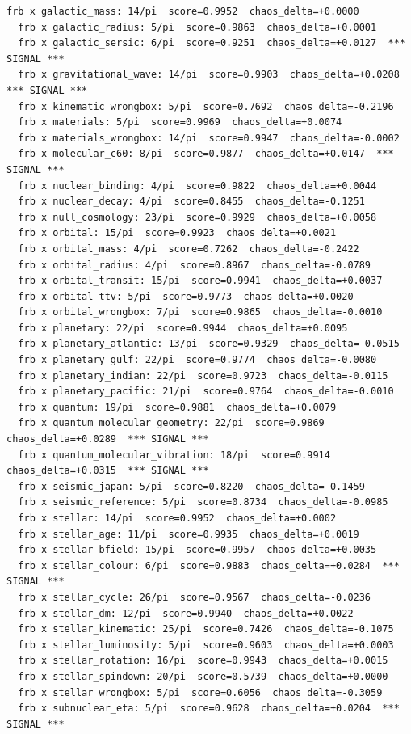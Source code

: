 \documentclass[11pt, letterpaper, openany]{book}
\begin{document}
\begin{empiricalbox}
\begin{lstlisting}[style=terminal]
  frb x galactic_mass: 14/pi  score=0.9952  chaos_delta=+0.0000
  frb x galactic_radius: 5/pi  score=0.9863  chaos_delta=+0.0001
  frb x galactic_sersic: 6/pi  score=0.9251  chaos_delta=+0.0127  *** SIGNAL ***
  frb x gravitational_wave: 14/pi  score=0.9903  chaos_delta=+0.0208  *** SIGNAL ***
  frb x kinematic_wrongbox: 5/pi  score=0.7692  chaos_delta=-0.2196
  frb x materials: 5/pi  score=0.9969  chaos_delta=+0.0074
  frb x materials_wrongbox: 14/pi  score=0.9947  chaos_delta=-0.0002
  frb x molecular_c60: 8/pi  score=0.9877  chaos_delta=+0.0147  *** SIGNAL ***
  frb x nuclear_binding: 4/pi  score=0.9822  chaos_delta=+0.0044
  frb x nuclear_decay: 4/pi  score=0.8455  chaos_delta=-0.1251
  frb x null_cosmology: 23/pi  score=0.9929  chaos_delta=+0.0058
  frb x orbital: 15/pi  score=0.9923  chaos_delta=+0.0021
  frb x orbital_mass: 4/pi  score=0.7262  chaos_delta=-0.2422
  frb x orbital_radius: 4/pi  score=0.8967  chaos_delta=-0.0789
  frb x orbital_transit: 15/pi  score=0.9941  chaos_delta=+0.0037
  frb x orbital_ttv: 5/pi  score=0.9773  chaos_delta=+0.0020
  frb x orbital_wrongbox: 7/pi  score=0.9865  chaos_delta=-0.0010
  frb x planetary: 22/pi  score=0.9944  chaos_delta=+0.0095
  frb x planetary_atlantic: 13/pi  score=0.9329  chaos_delta=-0.0515
  frb x planetary_gulf: 22/pi  score=0.9774  chaos_delta=-0.0080
  frb x planetary_indian: 22/pi  score=0.9723  chaos_delta=-0.0115
  frb x planetary_pacific: 21/pi  score=0.9764  chaos_delta=-0.0010
  frb x quantum: 19/pi  score=0.9881  chaos_delta=+0.0079
  frb x quantum_molecular_geometry: 22/pi  score=0.9869  chaos_delta=+0.0289  *** SIGNAL ***
  frb x quantum_molecular_vibration: 18/pi  score=0.9914  chaos_delta=+0.0315  *** SIGNAL ***
  frb x seismic_japan: 5/pi  score=0.8220  chaos_delta=-0.1459
  frb x seismic_reference: 5/pi  score=0.8734  chaos_delta=-0.0985
  frb x stellar: 14/pi  score=0.9952  chaos_delta=+0.0002
  frb x stellar_age: 11/pi  score=0.9935  chaos_delta=+0.0019
  frb x stellar_bfield: 15/pi  score=0.9957  chaos_delta=+0.0035
  frb x stellar_colour: 6/pi  score=0.9883  chaos_delta=+0.0284  *** SIGNAL ***
  frb x stellar_cycle: 26/pi  score=0.9567  chaos_delta=-0.0236
  frb x stellar_dm: 12/pi  score=0.9940  chaos_delta=+0.0022
  frb x stellar_kinematic: 25/pi  score=0.7426  chaos_delta=-0.1075
  frb x stellar_luminosity: 5/pi  score=0.9603  chaos_delta=+0.0003
  frb x stellar_rotation: 16/pi  score=0.9943  chaos_delta=+0.0015
  frb x stellar_spindown: 20/pi  score=0.5739  chaos_delta=+0.0000
  frb x stellar_wrongbox: 5/pi  score=0.6056  chaos_delta=-0.3059
  frb x subnuclear_eta: 5/pi  score=0.9628  chaos_delta=+0.0204  *** SIGNAL ***

\end{lstlisting}
\end{empiricalbox}
\end{document}
